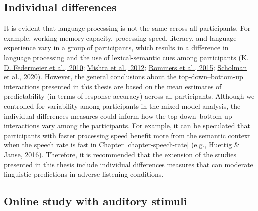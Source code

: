 \documentclass[a4paper, nobind]{templates/ociamthesis}
\begin{document}
\hypertarget{individual-differences}{%
\subsection{Individual differences}\label{individual-differences}}

It is evident that language processing is not the same across all participants.
For example, working memory capacity, processing speed, literacy, and language experience vary in a group of participants,
which results in a difference in language processing and the use of lexical-semantic cues among participants (\protect\hyperlink{ref-Federmeier2010}{K. D. Federmeier et al., 2010}; \protect\hyperlink{ref-Mishra2012}{Mishra et al., 2012}; \protect\hyperlink{ref-Rommers2015}{Rommers et al., 2015}; \protect\hyperlink{ref-Scholman2020}{Scholman et al., 2020}).
However, the general conclusions about the top-down--bottom-up interactions presented in this thesis are based on the mean estimates of predictability (in terms of response accuracy) across all participants.
Although we controlled for variability among participants in the mixed model analysis,
the individual differences measures could inform how the top-down--bottom-up interactions vary among the participants.
For example, it can be speculated that participants with faster processing speed benefit more from the semantic context when the speech rate is fast in Chapter \ref{chapter-speech-rate} (e.g., \protect\hyperlink{ref-Huettig2016a}{Huettig \& Janse, 2016}).
Therefore, it is recommended that the extension of the studies presented in this thesis include individual differences measures that can moderate linguistic predictions in adverse listening conditions.

\hypertarget{online-study-with-auditory-stimuli}{%
\subsection{Online study with auditory stimuli}\label{online-study-with-auditory-stimuli}}
\end{document}
